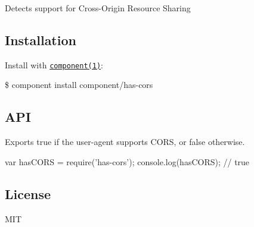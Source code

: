 Detects support for Cross-\/\+Origin Resource Sharing

\subsection*{Installation}

Install with \href{http://component.io}{\tt component(1)}\+:

\$ component install component/has-\/cors

\subsection*{A\+PI}

Exports {\ttfamily true} if the user-\/agent supports C\+O\+RS, or {\ttfamily false} otherwise.


\begin{DoxyCode}
var hasCORS = require('has-cors');
console.log(hasCORS);
// true
\end{DoxyCode}


\subsection*{License}

M\+IT 